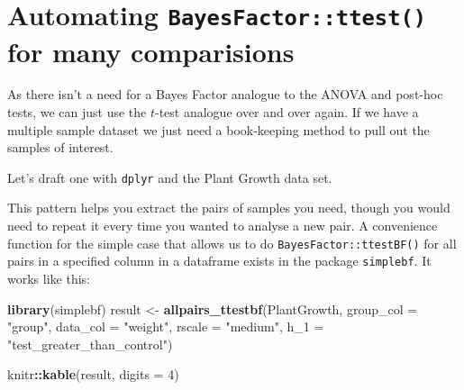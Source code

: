 \documentclass[
]{book}
\newenvironment{Shaded}{\begin{snugshade}}{\end{snugshade}}
\newcommand{\DataTypeTok}[1]{\textcolor[rgb]{0.13,0.29,0.53}{#1}}
\newcommand{\DecValTok}[1]{\textcolor[rgb]{0.00,0.00,0.81}{#1}}
\newcommand{\KeywordTok}[1]{\textcolor[rgb]{0.13,0.29,0.53}{\textbf{#1}}}
\newcommand{\NormalTok}[1]{#1}
\newcommand{\OperatorTok}[1]{\textcolor[rgb]{0.81,0.36,0.00}{\textbf{#1}}}
\newcommand{\StringTok}[1]{\textcolor[rgb]{0.31,0.60,0.02}{#1}}
\begin{document}
\hypertarget{automating-bayesfactorttest-for-many-comparisions}{%
\section{\texorpdfstring{Automating \texttt{BayesFactor::ttest()} for many comparisions}{Automating BayesFactor::ttest() for many comparisions}}\label{automating-bayesfactorttest-for-many-comparisions}}

As there isn't a need for a Bayes Factor analogue to the ANOVA and post-hoc tests, we can just use the \(t\)-test analogue over and over again. If we have a multiple sample dataset we just need a book-keeping method to pull out the samples of interest.

Let's draft one with \texttt{dplyr} and the Plant Growth data set.

\begin{Shaded}
\end{Shaded}

This pattern helps you extract the pairs of samples you need, though you would need to repeat it every time you wanted to analyse a new pair. A convenience function for the simple case that allows us to do \texttt{BayesFactor::ttestBF()} for all pairs in a specified column in a dataframe exists in the package \texttt{simplebf}. It works like this:

\begin{Shaded}
\begin{Highlighting}[]
\KeywordTok{library}\NormalTok{(simplebf)}
\NormalTok{result <-}\StringTok{ }\KeywordTok{allpairs_ttestbf}\NormalTok{(PlantGrowth, }
                           \DataTypeTok{group_col =} \StringTok{"group"}\NormalTok{, }\DataTypeTok{data_col =} \StringTok{"weight"}\NormalTok{, }
                           \DataTypeTok{rscale =} \StringTok{"medium"}\NormalTok{, }
                           \DataTypeTok{h_1 =} \StringTok{"test_greater_than_control"}\NormalTok{)}

\NormalTok{knitr}\OperatorTok{::}\KeywordTok{kable}\NormalTok{(result, }\DataTypeTok{digits =} \DecValTok{4}\NormalTok{)}
\end{Highlighting}
\end{Shaded}
\end{document}
